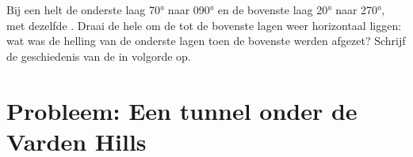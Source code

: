 \begin{exercise}[$\star\star\star$]\label{exo:b1:cross-sections:12}
Bij een  helt de onderste laag \ang{70} naar \ang{090} en de bovenste laag \ang{20} naar
\ang{270}, met dezelfde . Draai de hele  om de  tot de bovenste lagen weer horizontaal
liggen: wat was de helling van de onderste lagen toen de bovenste werden afgezet? Schrijf de geschiedenis van de
 in volgorde op.
\end{exercise}

\section{Probleem: Een tunnel onder de Varden Hills}

